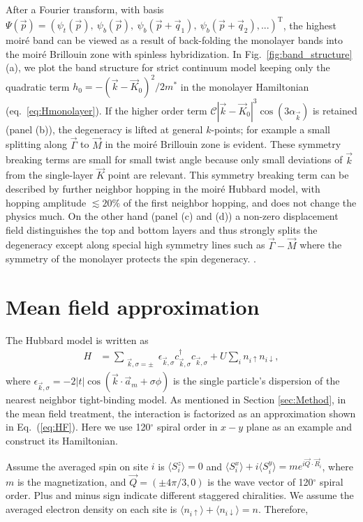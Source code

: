 \documentclass[%
reprint,
superscriptaddress,
twocolumn,
 amsmath,amssymb,
 aps,
 prb,
]{revtex4-2}
\begin{document}
After a Fourier transform, with basis $\Psi(\vec{p})=(\psi_t(\vec{p}),~\psi_b(\vec{p}),~\psi_b(\vec{p}+\vec{q}_1),~\psi_b(\vec{p}+\vec{q}_2),...)^\text{T}$, the highest moir\'e band can be viewed as a result of back-folding the monolayer bands into the moir\'e Brillouin zone with spinless hybridization. In Fig.~\ref{fig:band_structure}(a), we plot the band structure for strict continuum  model keeping only the quadratic term $h_0=-(\vec{k}-\vec{K}_0)^{2} / 2 m^\ast$ in the monolayer Hamiltonian (eq.~\ref{eq:Hmonolayer}). If the higher order term $\mathcal{C}|\vec{k}-\vec{K}_0|^{3} \cos (3 \alpha_{\vec{k}})$ is retained (panel (b)), the degeneracy is lifted at general $k$-points; for example  a small splitting along $\vec{\Gamma}$ to $\vec{M}$ in the moir\'e Brillouin zone is evident. These symmetry breaking terms are small for small twist angle because only small deviations of $\vec{k}$ from the single-layer $\vec{K}$ point are relevant. This symmetry breaking term can be described by further neighbor hopping in the moir\'e Hubbard model, with hopping amplitude $\lesssim20\%$  of the first neighbor hopping, and does not change the physics much.  On the other hand (panel (c) and (d)) a non-zero displacement field distinguishes the top and bottom layers and thus strongly splits the degeneracy except along special high symmetry lines such as $\vec{\Gamma}-\vec{M}$ where the symmetry of the monolayer protects the  spin degeneracy.  \cite{Wang:2020us}. 

\section{Mean field approximation }\label{app:meanfield}
The Hubbard model is written as
\begin{align}
	H&=\sum_{\substack{\vec{k},\sigma=\pm}}\epsilon_{\vec{k},\sigma}c^{\dagger}_{\vec{k},\sigma}c_{\vec{k},\sigma}+U \sum_{i} n_{i \uparrow} n_{i\downarrow},
\end{align}
where $\epsilon_{\vec{k},\sigma}=-2|t|\cos (\vec{k} \cdot \vec{a}_{m}+\sigma \phi)$ is the single particle's dispersion of the nearest neighbor tight-binding model. As mentioned in Section \ref{sec:Method}, in the mean field treatment, the interaction is factorized as an approximation shown in Eq.~(\ref{eq:HF}). Here we use 120$^\circ$ spiral order in $x-y$ plane as an example and construct its Hamiltonian.

Assume the averaged spin on site $i$ is $\langle S_i^z\rangle=0$ and $\langle S_i^x\rangle+i\langle S_i^y\rangle= me^{i\vec{Q}\cdot\vec{R}_i}$, where $m$ is the magnetization, and $\vec{Q}=(\pm4\pi/3,0)$ is the wave vector of 120$^\circ$ spiral order. Plus and minus sign indicate different staggered chiralities. We assume the averaged electron density on each site is $\langle n_{i\uparrow} \rangle + \langle n_{i\downarrow}\rangle =n$. Therefore,
\end{document}
